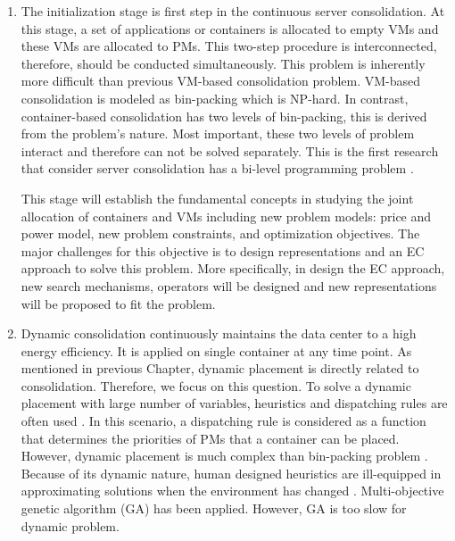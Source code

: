 \begin{enumerate}
\item The initialization stage is first step in the continuous server consolidation.
At this stage, a set of applications or containers is allocated to empty VMs and these VMs are allocated to PMs. This two-step procedure is interconnected, therefore, should be conducted simultaneously. 
This problem is inherently more difficult than previous VM-based consolidation problem. VM-based consolidation is modeled as bin-packing which is NP-hard. In contrast, container-based consolidation has two levels of bin-packing, this is derived from the problem's nature. Most important, these two levels of problem interact and therefore can not be solved separately. This is the first research that consider server consolidation has a bi-level programming problem \cite{Wen:1991kt}. 

This stage will establish the fundamental concepts in studying the joint allocation of containers and VMs including new problem models: price and power model, new problem constraints, and optimization objectives. The major challenges for this objective is to design representations and an EC approach to solve this problem. More specifically, in design the EC approach, new search mechanisms, operators will be designed and new representations will be proposed to fit the problem. 


\item Dynamic consolidation continuously maintains the data center to a high energy efficiency. 
It is applied on single container at any time point. As mentioned in previous Chapter, dynamic placement is directly related to consolidation. Therefore, we focus on this question. To solve a dynamic placement with large number of variables, heuristics and dispatching rules are often used \cite{Sarin:2011fu, Shi:2011ke, Forsman:2015ca, Beloglazov:2012ji}.  In this scenario, a dispatching rule is considered as a function that determines the priorities of PMs that a container can be placed. However, dynamic placement is much complex than bin-packing problem \cite{Mann:2015ua}. Because of its dynamic nature, human designed heuristics are ill-equipped in approximating solutions when the environment has changed \cite{SoteloFigueroa:2013be}. Multi-objective genetic algorithm (GA) \cite{Xu:2010vh} has been applied. However, GA is too slow for dynamic problem. 


\end{enumerate}
